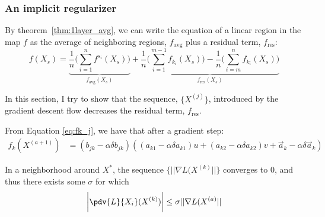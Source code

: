 \subsubsection{An implicit regularizer}

\newcommand{\favg}{f_\text{avg}}
\newcommand{\fres}{f_\text{res}}
\newcommand{\gres}{g_\text{res}}

By theorem~\ref{thm:1layer_avg}, we can write the equation of a linear region in the map $f$ as the average of neighboring regions, $\favg$ plus a residual term, $\fres$:
\begin{equation*}
    f(X_s) = \underbrace{\frac{1}{n} \big(\sum_{i=1}^{n} f^{s_i}(X_s) \big)}_{\favg(X_s)} + 
             \underbrace{\frac{1}{n} \big(\sum_{i=1}^{m-1} f_{k_i}(X_s) \big) -
              \frac{1}{n} \big(\sum_{i=m}^{n} f_{k_i}(X_s) \big)}_{\fres(X_s)}
\end{equation*}

In this section, I try to show that the sequence, $\{X^{(j)}\}$, introduced by the gradient descent flow decreases the residual term, $\fres$.

From Equation \ref{eq:fk_j}, we have that after a gradient step:
\begin{align}
    f_k(X^{(a+1)}) &= (b_{jk} - \alpha \delta b_{jk}) ( (a_{k1} - \alpha \delta a_{k1})u + (a_{k2} - \alpha \delta a_{k2})v + \vec{a}_{k} - \alpha \delta \vec{a}_{k})\label{eq:gstep}
\end{align}

In a neighborhood around $X^\ast$, the sequence $\{||\nabla L(X^{(k)}||\}$ converges to 0, and thus there exists some $\sigma$ for which
\begin{equation}\label{eq:bound_pdv}
    \bigg|\pdv{L}{X_i}(X^{(k)})\bigg| \leq \sigma ||\nabla L(X^{(a)}||
\end{equation}

